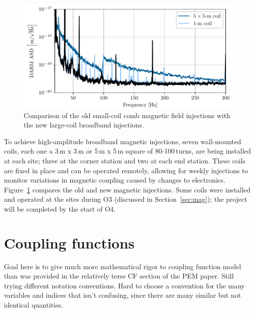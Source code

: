 \begin{figure}[h!]
	\centering
	\includegraphics{figures/noise-methods/injection-wallcoil.pdf}
	\caption{
		Comparison of the old small-coil comb magnetic field injections with the new large-coil broadband injections.}
	\label{fig:injection-wallcoil}
\end{figure}

To achieve high-amplitude broadband magnetic injections, seven wall-mounted coils, each one a 3\,m x 3\,m or 5\,m x 5\,m square of 80-100\,turns, are being installed at each site; three at the corner station and two at each end station. These coils are fixed in place and can be operated remotely, allowing for weekly injections to monitor variations in magnetic coupling caused by changes to electronics. Figure~\ref{fig:injection-wallcoil} compares the old and new magnetic injections. Some coils were installed and operated at the sites during O3 (discussed in Section~\ref{sec:mag}); the project will be completed by the start of O4.







\section{Coupling functions}\label{sec:cf}

{\color{red}
Goal here is to give much more mathematical rigor to coupling function model than was provided in the relatively terse CF section of the PEM paper.
Still trying different notation conventions.
Hard to choose a convention for the many variables and indices that isn't confusing, since there are many similar but not identical quantities.}

